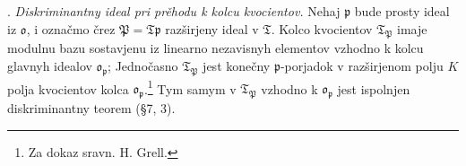 \documentclass[11pt]{article}
\newcommand{\mo}{\mathfrak{o}}
\newcommand{\mT}{\mathfrak{T}}
\newcommand{\mP}{\mathfrak{P}}
\newcommand{\mpideal}{\mathfrak{p}}
\begin{document}
\setcounter{footnote}{37}

. \emph{Diskriminantny ideal pri prěhodu k kolcu kvocientov.} Nehaj $\mpideal$ bude prosty ideal iz $\mo$, i označmo črez $\mP=\mT\mpideal$ razširjeny ideal v $\mT$. Kolco kvocientov $\mT_\mP$ imaje modulnu bazu sostavjenu iz linearno nezavisnyh elementov vzhodno k kolcu glavnyh idealov $\mo_\mpideal$; Jednočasno $\mT_\mP$ jest konečny $\mpideal$-porjadok v razširjenom polju $K$ polja kvocientov kolca $\mo_\mpideal$.\footnote{Za dokaz sravn. H. Grell.} Tym samym v $\mT_\mP$ vzhodno k $\mo_\mpideal$ jest ispolnjen diskriminantny teorem (§7, 3).
\end{document}
